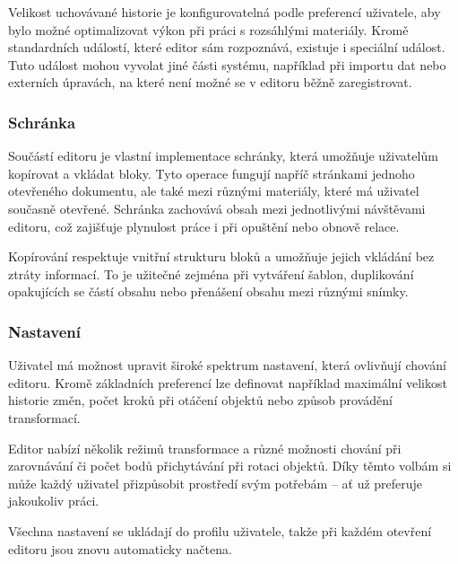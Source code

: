 Velikost uchovávané historie je konfigurovatelná podle preferencí uživatele, aby bylo možné optimalizovat výkon při práci s rozsáhlými materiály. 
Kromě standardních událostí, které editor sám rozpoznává, existuje i speciální událost.
Tuto událost mohou vyvolat jiné části systému, například při importu dat nebo externích úpravách, na které není možné se v editoru běžně zaregistrovat.

\subsubsection{Schránka}

Součástí editoru je vlastní implementace schránky, která umožňuje uživatelům kopírovat a vkládat bloky. 
Tyto operace fungují napříč stránkami jednoho otevřeného dokumentu, ale také mezi různými materiály, které má uživatel současně otevřené. 
Schránka zachovává obsah mezi jednotlivými návštěvami editoru, což zajišťuje plynulost práce i při opuštění nebo obnově relace.

Kopírování respektuje vnitřní strukturu bloků a umožňuje jejich vkládání bez ztráty informací. 
To je užitečné zejména při vytváření šablon, duplikování opakujících se částí obsahu nebo přenášení obsahu mezi různými snímky.

\subsubsection{Nastavení}

Uživatel má možnost upravit široké spektrum nastavení, která ovlivňují chování editoru. 
Kromě základních preferencí lze definovat například maximální velikost historie změn, počet kroků při otáčení objektů nebo způsob provádění transformací.

Editor nabízí několik režimů transformace a různé možnosti chování při zarovnávání či počet bodů přichytávání při rotaci objektů. 
Díky těmto volbám si může každý uživatel přizpůsobit prostředí svým potřebám -- ať už preferuje jakoukoliv práci.

Všechna nastavení se ukládají do profilu uživatele, takže při každém otevření editoru jsou znovu automaticky načtena.




